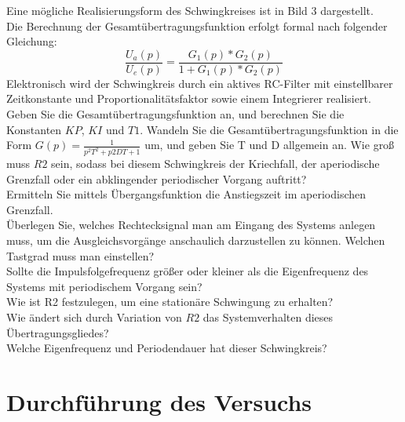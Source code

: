 Eine mögliche Realisierungsform des Schwingkreises ist in Bild 3 dargestellt.\\

Die Berechnung der Gesamtübertragungsfunktion erfolgt formal nach folgender Gleichung: \\
\newline
\begin{equation}
	\frac{ U_{ a }(p) }{ U_{ e }(p) } =\frac{ G_{ 1 }(p)*G_{ 2 }(p) }{ 1+G_{ 1 }(p)*G_{ 2 }(p)  }
\end{equation}
\newline
Elektronisch wird der Schwingkreis durch ein aktives RC-Filter mit einstellbarer Zeitkonstante
und Proportionalitätsfaktor sowie einem Integrierer realisiert.\\
Geben Sie die Gesamtübertragungsfunktion an, und berechnen Sie die Konstanten $KP$, $KI$ und $T1$. 
Wandeln Sie die Gesamtübertragungsfunktion in die Form $G(p)=\frac{ 1 }{ p^{ 2 }T^{ 2 }+p2DT+1 }$ um, und geben Sie T und D allgemein an. 
Wie groß muss $R2$ sein, sodass bei diesem Schwingkreis der Kriechfall, der aperiodische Grenzfall oder ein 
abklingender periodischer Vorgang auftritt?\\
\newline%
Ermitteln Sie mittels Übergangsfunktion die Anstiegszeit im 
aperiodischen Grenzfall. \\
Überlegen Sie, welches Rechtecksignal man am Eingang des Systems anlegen muss, um die 
Ausgleichsvorgänge anschaulich darzustellen zu können. Welchen Tastgrad muss man einstellen?\\
\newline%
Sollte die Impulsfolgefrequenz größer oder kleiner als die Eigenfrequenz des Systems mit periodischem Vorgang sein?\\
\newline%
Wie ist R2 festzulegen, um eine stationäre Schwingung zu erhalten?\\
\newline%
Wie ändert sich durch Variation von $R2$ das Systemverhalten dieses Übertragungsgliedes?\\
\newline%
Welche Eigenfrequenz und Periodendauer hat dieser Schwingkreis?\\
\newline%

\section{Durchführung des Versuchs}

